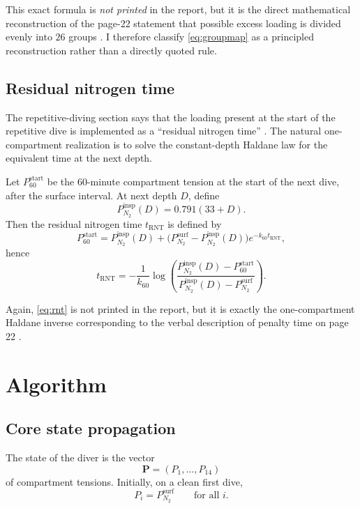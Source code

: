 \documentclass[11pt]{article}
\begin{document}
This exact formula is \emph{not printed} in the report, but it is the direct mathematical reconstruction of the page-22 statement that possible excess loading is divided evenly into $26$ groups \cite[p.~22]{Hamilton1994}. I therefore classify \eqref{eq:groupmap} as a principled reconstruction rather than a directly quoted rule.

\subsection{Residual nitrogen time}

The repetitive-diving section says that the loading present at the start of the repetitive dive is implemented as a ``residual nitrogen time'' \cite[p.~22]{Hamilton1994}. The natural one-compartment realization is to solve the constant-depth Haldane law for the equivalent time at the next depth.

Let $P_{60}^{\mathrm{start}}$ be the 60-minute compartment tension at the start of the next dive, after the surface interval. At next depth $D$, define
\[
P_{N_2}^{\mathrm{insp}}(D)=0.791(33+D).
\]
Then the residual nitrogen time $t_{\mathrm{RNT}}$ is defined by
\[
P_{60}^{\mathrm{start}}
=
P_{N_2}^{\mathrm{insp}}(D)
+
\bigl(P_{N_2}^{\mathrm{surf}}-P_{N_2}^{\mathrm{insp}}(D)\bigr)e^{-k_{60} t_{\mathrm{RNT}}},
\]
hence
\begin{equation}
t_{\mathrm{RNT}}
=
-\frac{1}{k_{60}}
\log\!\left(
\frac{P_{N_2}^{\mathrm{insp}}(D)-P_{60}^{\mathrm{start}}}
     {P_{N_2}^{\mathrm{insp}}(D)-P_{N_2}^{\mathrm{surf}}}
\right).
\label{eq:rnt}
\end{equation}

Again, \eqref{eq:rnt} is not printed in the report, but it is exactly the one-compartment Haldane inverse corresponding to the verbal description of penalty time on page 22 \cite[p.~22]{Hamilton1994}.

\section{Algorithm}

\subsection{Core state propagation}

The state of the diver is the vector
\[
\mathbf{P}=(P_1,\dots,P_{14})
\]
of compartment tensions. Initially, on a clean first dive,
\[
P_i=P_{N_2}^{\mathrm{surf}}
\qquad\text{for all }i.
\]
\end{document}

